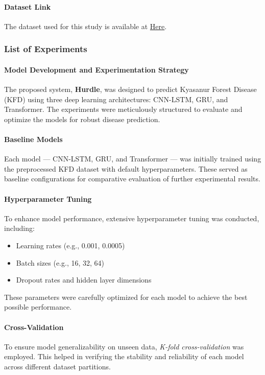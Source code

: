 \documentclass[conference]{IEEEtran}
\begin{document}
\paragraph{Dataset Link} The dataset used for this study is available at \href{https://www.kaggle.com/datasets/abhisheknits/kyasanur-forest-disease-kfd}{Here}.

\subsubsection{List of Experiments}
\paragraph{Model Development and Experimentation Strategy}

The proposed system, \textbf{Hurdle}, was designed to predict Kyasanur Forest Disease (KFD) using three deep learning architectures: CNN-LSTM, GRU, and Transformer. The experiments were meticulously structured to evaluate and optimize the models for robust disease prediction.

\paragraph{Baseline Models}
Each model — CNN-LSTM, GRU, and Transformer — was initially trained using the preprocessed KFD dataset with default hyperparameters. These served as baseline configurations for comparative evaluation of further experimental results.

\paragraph{Hyperparameter Tuning}
To enhance model performance, extensive hyperparameter tuning was conducted, including:
\begin{itemize}
    \item Learning rates (e.g., 0.001, 0.0005)
    \item Batch sizes (e.g., 16, 32, 64)
    \item Dropout rates and hidden layer dimensions
\end{itemize}
These parameters were carefully optimized for each model to achieve the best possible performance.

\paragraph{Cross-Validation}
To ensure model generalizability on unseen data, \textit{K-fold cross-validation} was employed. This helped in verifying the stability and reliability of each model across different dataset partitions.
\end{document}
